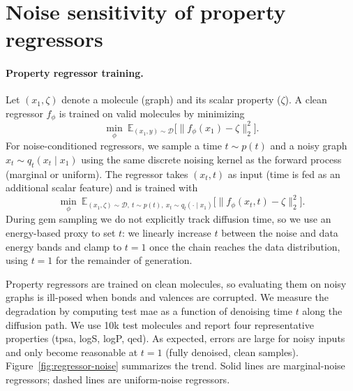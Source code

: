 \section{Noise sensitivity of property regressors}
\label{app:regressor-noise}
\paragraph{Property regressor training.}
Let $(x_1,\zeta)$ denote a molecule (graph) and its scalar property ($\zeta$). A clean regressor $f_\phi$ is
trained on valid molecules by minimizing
\begin{equation}
\min_\phi~\mathbb{E}_{(x_1,y)\sim \mathcal{D}}
\big[\|f_\phi(x_1)-\zeta\|_2^2\big].
\end{equation}
For noise-conditioned regressors, we sample a time $t\sim p(t)$ and a noisy graph
$x_t\sim q_t(x_t\mid x_1)$ using the same discrete noising kernel as the forward process
(marginal or uniform). The regressor takes $(x_t,t)$ as input (time is fed as an additional scalar
feature) and is trained with
\begin{equation}
\min_\phi~\mathbb{E}_{(x_1,\zeta)\sim \mathcal{D},~t\sim p(t),~x_t\sim q_t(\cdot\mid x_1)}
\big[\|f_\phi(x_t,t)-\zeta\|_2^2\big].
\end{equation}
During \gls{gem} sampling we do not explicitly track diffusion time, so we use an energy-based proxy to
set $t$: we linearly increase $t$ between the noise and data energy bands and clamp to $t=1$ once
the chain reaches the data distribution, using $t=1$ for the remainder of generation.

Property regressors are trained on clean molecules, so evaluating them on noisy graphs is
ill-posed when bonds and valences are corrupted. We measure the degradation by computing test
\gls{mae} as a function of denoising time $t$ along the diffusion path. We use 10k test molecules and
report four representative properties (\gls{tpsa}, logS, logP, \gls{qed}). As expected, errors are large for
noisy inputs and only become reasonable at $t=1$ (fully denoised, clean samples).
Figure~\ref{fig:regressor-noise} summarizes the trend. Solid lines are marginal-noise regressors;
dashed lines are uniform-noise regressors.

